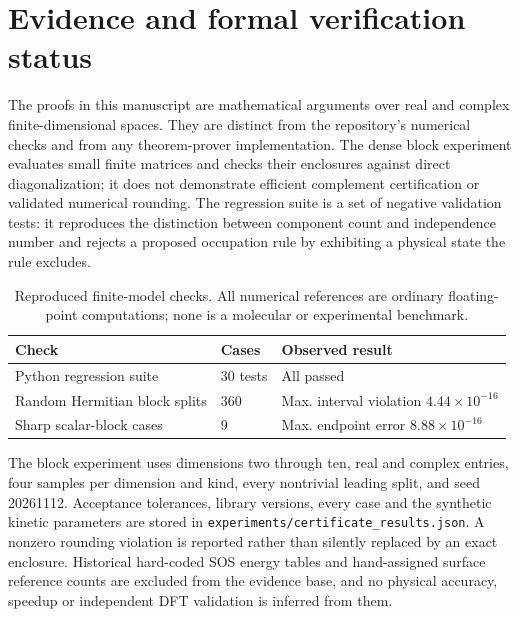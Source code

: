 \documentclass[11pt,a4paper]{article}
\theoremstyle{plain}
\theoremstyle{definition}
\theoremstyle{remark}
\providecommand{\path}[1]{\texttt{#1}}
\begin{document}
\section{Evidence and formal verification status}
\label{sec:formalization}
The proofs in this manuscript are mathematical arguments over real and complex
finite-dimensional spaces. They are distinct from the repository's numerical
checks and from any theorem-prover implementation. The dense block experiment
evaluates small finite matrices and checks their enclosures against direct
diagonalization; it does not demonstrate efficient complement certification or
validated numerical rounding. The regression suite is a set of negative
validation tests: it reproduces the distinction between component count and
independence number and rejects a proposed occupation rule by exhibiting a
physical state the rule excludes.

\begin{table}[ht]
\centering
\caption{Reproduced finite-model checks. All numerical references are ordinary
floating-point computations; none is a molecular or experimental benchmark.}
\begin{tabular}{lll}
\hline
Check & Cases & Observed result \\
\hline
Python regression suite & 30 tests & All passed \\
Random Hermitian block splits & 360 & Max. interval violation $4.44\times10^{-16}$ \\
Sharp scalar-block cases & 9 & Max. endpoint error $8.88\times10^{-16}$ \\
\hline
\end{tabular}
\label{tab:reproduced}
\end{table}

The block experiment uses dimensions two through ten, real and complex entries,
four samples per dimension and kind, every nontrivial leading split, and seed
20261112. Acceptance tolerances, library versions, every case and the synthetic
kinetic parameters are stored in \path{experiments/certificate_results.json}. A
nonzero rounding violation is reported rather than silently replaced by an exact
enclosure. Historical hard-coded SOS energy tables and hand-assigned surface
reference counts are excluded from the evidence base, and no physical accuracy,
speedup or independent DFT validation is inferred from them.
\end{document}
